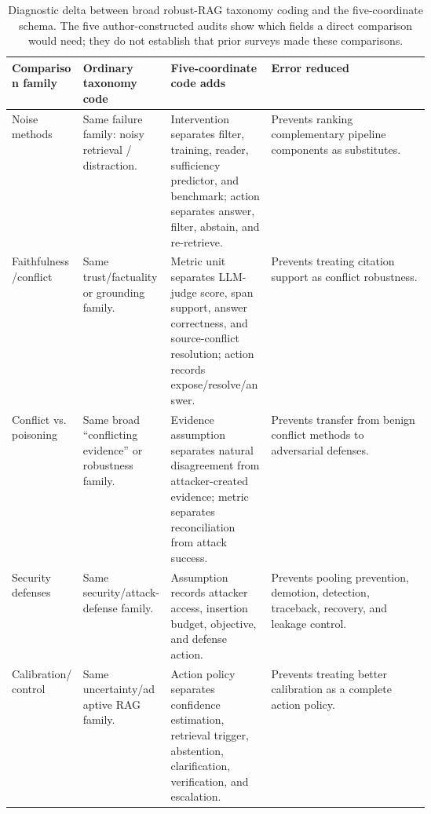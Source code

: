 \begin{table}[t]
\centering
\scriptsize
\renewcommand{\arraystretch}{0.88}
\begin{tabularx}{\linewidth}{>{\raggedright\arraybackslash}p{0.17\linewidth}>{\raggedright\arraybackslash}p{0.21\linewidth}>{\raggedright\arraybackslash}p{0.24\linewidth}X}
\toprule
\textbf{Comparison family} & \textbf{Ordinary taxonomy code} & \textbf{Five-coordinate code adds} & \textbf{Error reduced} \\
\midrule
Noise methods & Same failure family: noisy retrieval / distraction. & Intervention separates filter, training, reader, sufficiency predictor, and benchmark; action separates answer, filter, abstain, and re-retrieve. & Prevents ranking complementary pipeline components as substitutes. \\
Faithfulness/conflict & Same trust/factuality or grounding family. & Metric unit separates LLM-judge score, span support, answer correctness, and source-conflict resolution; action records expose/resolve/answer. & Prevents treating citation support as conflict robustness. \\
Conflict vs. poisoning & Same broad ``conflicting evidence'' or robustness family. & Evidence assumption separates natural disagreement from attacker-created evidence; metric separates reconciliation from attack success. & Prevents transfer from benign conflict methods to adversarial defenses. \\
Security defenses & Same security/attack-defense family. & Assumption records attacker access, insertion budget, objective, and defense action. & Prevents pooling prevention, demotion, detection, traceback, recovery, and leakage control. \\
Calibration/control & Same uncertainty/adaptive RAG family. & Action policy separates confidence estimation, retrieval trigger, abstention, clarification, verification, and escalation. & Prevents treating better calibration as a complete action policy. \\
\bottomrule
\end{tabularx}
\caption{Diagnostic delta between broad robust-RAG taxonomy coding and the five-coordinate schema. The five author-constructed audits show which fields a direct comparison would need; they do not establish that prior surveys made these comparisons.}
\label{tab:tuple-taxonomy-delta}
\end{table}
